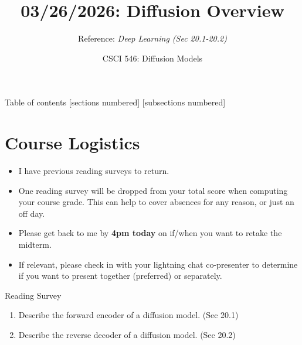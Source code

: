 \documentclass[10pt]{beamer}
\title{03/26/2026: Diffusion Overview}
\author{Reference: \textit{Deep Learning (Sec 20.1-20.2)}}
\date{CSCI 546: Diffusion Models}
\begin{document}
\maketitle


\begin{frame}{Table of contents}
  [sections numbered]
  [subsections numbered]
  \tableofcontents
\end{frame}





\section{Course Logistics}



\begin{frame}
\begin{myredbox}[title=Announcements]

\begin{itemize}
	\item I have previous reading surveys to return. \pause 
	\item One reading survey will be dropped from your total score when computing your course grade.  This can help to cover absences for any reason, or just an off day. \pause 
	\item Please get back to me by \textbf{4pm today} on if/when  you want to retake the midterm.  \pause 
	\item If relevant, please check in with your lightning chat co-presenter to determine if you want to present together (preferred) or separately.  
\end{itemize}
\end{myredbox}
\end{frame}


\begin{frame}{Reading Survey}

\begin{enumerate}
	\item Describe the forward encoder of a diffusion model. (Sec 20.1)
	\item Describe the reverse decoder of a diffusion model. (Sec 20.2)
\end{enumerate}
	
\end{frame}
\end{document}
